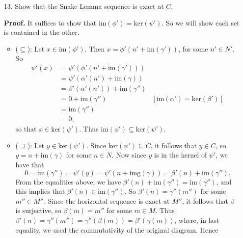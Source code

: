 \documentclass[9pt]{article}
\begin{document}
\begin{enumerate}
   \item[13.]  Show that the Snake Lemma sequence is exact at $C$.

      \textbf{Proof.} It suffices to show that
      $\text{im}(\phi') = \text{ker}(\psi')$. So we will show each set is
      contained in the other.
      \begin{itemize}
         \item ($\subseteq$): Let $x \in \text{im}(\phi')$. Then
               $x = \phi'(n' + \text{im}(\gamma'))$, for some $n' \in N'$. So
               \begin{align*}
                  \psi'(x) &= \psi'(\phi'(n' + \text{im}(\gamma'))) \\
                     &= \psi'(\alpha'(n') + \text{im}(\gamma)) \\
                     &= \beta'(\alpha'(n')) + \text{im}(\gamma'') \\
                     &= 0 + \text{im}(\gamma'')
                        &[\text{im}(\alpha') = \text{ker}(\beta')] \\
                     &= \text{im}(\gamma'') \\
                     &= 0,
               \end{align*}
               so that $x \in \text{ker}(\psi')$. Thus 
               $\text{im}(\phi') \subseteq \text{ker}(\psi')$.
         \item ($\supseteq$): Let $y \in \text{ker}(\psi')$. Since
               $\text{ker}(\psi') \subseteq C$, it follows that $y \in C$, so
               $y = n + \text{im}(\gamma)$ for some $n \in N$. Now since $y$ is
               in the kernel of $\psi'$, we have that
               $$0 = \text{im}(\gamma'') = \psi'(y) =
                 \psi'(n + \text{img}(\gamma)) =
                 \beta'(n) + \text{im}(\gamma'').$$
               From the equalities above, we have
               $\beta'(n) + \text{im}(\gamma'') = \text{im}(\gamma'')$, and this
               implies that $\beta'(n) \in \text{im}(\gamma'')$. So
               $\beta'(n) = \gamma''(m'')$ for some $m'' \in M''$. Since the
               horizontal sequence is exact at $M''$, it follows that $\beta$ is
               surjective, so $\beta(m) = m''$ for some $m \in M$. Thus
               $\beta'(n) = \gamma''(m'') = \gamma''(\beta(m)) =
                \beta'(\gamma(m))$, where, in last equality, we used the
               commutativity of the original diagram. Hence

\end{itemize}
\end{enumerate}
\end{document}

